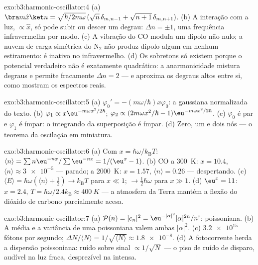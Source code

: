 \begin{solution}{exo:b3:harmonic-oscillator:4}
(a) $\bra m\hat x\ket n = \sqrt{\hbar/2m\omega}\,(\sqrt n\,
\delta_{m,n-1} + \sqrt{n + 1}\,\delta_{m,n+1})$. (b) A interação com a
luz, $\propto\hat x$, só pode subir ou descer um degrau: $\Delta n =
\pm1$, uma frequência infravermelha por modo. (c) A vibração do CO
modula um dipolo não nulo; a nuvem de carga simétrica do N$_2$ não
produz dipolo algum em nenhum estiramento: é inativo no infravermelho.
(d) Os sobretons só existem porque o potencial verdadeiro não é
exatamente quadrático: a anarmonicidade mistura degraus e permite
fracamente $\Delta n = 2$ --- e aproxima os degraus altos entre si,
como mostram os espectros reais.
\end{solution}

\begin{solution}{exo:b3:harmonic-oscillator:5}
(a) $\varphi_0' = -(m\omega/\hbar)x\varphi_0$: a gaussiana normalizada
do texto. (b) $\varphi_1 \propto x\eu^{-m\omega
x^2/2\hbar}$; $\varphi_2 \propto (2m\omega x^2/\hbar -
1)\eu^{-m\omega x^2/2\hbar}$. (c) $\varphi_0$ é par e $\varphi_1$ é
ímpar: o integrando da superposição é ímpar. (d) Zero, um e dois nós
--- o teorema da oscilação em miniatura.
\end{solution}

\begin{solution}{exo:b3:harmonic-oscillator:6}
(a) Com $x = \hbar\omega/k_{\text{B}}T$: $\langle n\rangle =
\sum n\eu^{-nx}/\sum\eu^{-nx} = 1/(\eu^x - 1)$. (b) CO a
\qty{300}{K}: $x = 10.4$, $\langle n\rangle \approx \num{3e-5}$ ---
parado; a \qty{2000}{K}: $x = 1.57$, $\langle n\rangle = 0.26$ ---
despertando. (c) $\langle E\rangle = \hbar\omega(\langle n\rangle +
\tfrac12) \to k_{\text{B}}T$ para $x \ll 1$; $\to \tfrac12\hbar
\omega$ para $x \gg 1$. (d) $\eu^x = 11$: $x = 2.4$, $T =
\hbar\omega/2.4k_{\text{B}} \approx \qty{400}{K}$ --- a atmosfera da
Terra mantém a flexão do dióxido de carbono parcialmente acesa.
\end{solution}

\begin{solution}{exo:b3:harmonic-oscillator:7}
(a) $\mathcal P(n) = |c_n|^2 = \eu^{-|\alpha|^2}|\alpha|^{2n}/n!$:
poissoniana. (b) A média e a variância de uma poissoniana valem ambas
$|\alpha|^2$. (c) $\num{3.2e15}$ fótons por segundo; $\Delta N/\langle N\rangle =
1/\sqrt{\langle N\rangle} \approx \num{1.8e-8}$. (d) A fotocorrente herda a dispersão poissoniana: ruído
sobre sinal $\propto 1/\sqrt N$ --- o piso de ruído de disparo, audível
na luz fraca, desprezível na intensa.
\end{solution}

